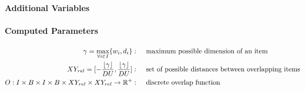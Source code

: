 \paragraph*{Additional Variables}


\paragraph*{Computed Parameters}
\begin{align}
    \gamma = \max_{\forall i \in I}\{ w_i, d_i \}  :\hspace{.5cm}& \text{maximum possible dimension of an item} \notag \\
    XY_{rel} =  [ - \frac{\lfloor \gamma \rfloor}{DU}, \frac{\lfloor \gamma \rfloor}{DU}]  :\hspace{.5cm}& \text{set of possible distances between overlapping items} \notag \\
    O : I \times B \times I \times B \times XY_{rel} \times XY_{rel} \rightarrow \mathbb{R}^+ :\hspace{.5cm}& \text{discrete overlap function} \label{eq:overlap_function}
\end{align}